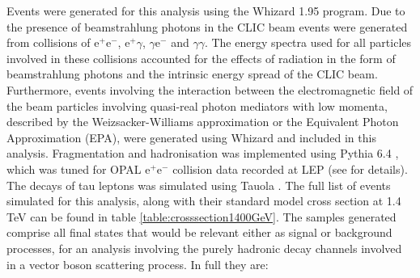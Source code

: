 Events were generated for this analysis using the Whizard \cite{0708.4233, hep-ph/0102195} 1.95 program.  Due to the presence of beamstrahlung photons in the CLIC beam events were generated from collisions of $\text{e}^{+}\text{e}^{-}$, $\text{e}^{+}\gamma$, $\gamma\text{e}^{-}$ and $\gamma\gamma$.  The energy spectra used for all particles involved in these collisions accounted for the effects of radiation in the form of beamstrahlung photons and the intrinsic energy spread of the CLIC beam.  Furthermore, events involving the interaction between the electromagnetic field of the beam particles involving quasi-real photon mediators with low momenta, described by the Weizsacker-Williams approximation or the Equivalent Photon Approximation (EPA), were generated using Whizard and included in this analysis.  Fragmentation and hadronisation was implemented using Pythia 6.4 \cite{Sjostrand:2006za}, which was tuned for OPAL $\text{e}^{+}\text{e}^{-}$ collision data recorded at LEP (see \cite{Linssen:2012hp} for details).  The decays of tau leptons was simulated using Tauola \cite{Was:2000st}.  The full list of events simulated for this analysis, along with their standard model cross section at 1.4 TeV can be found in table \ref{table:crosssection1400GeV}.  The samples generated comprise all final states that would be relevant either as signal or background processes, for an analysis involving the purely hadronic decay channels involved in a vector boson scattering process.  In full they are:


